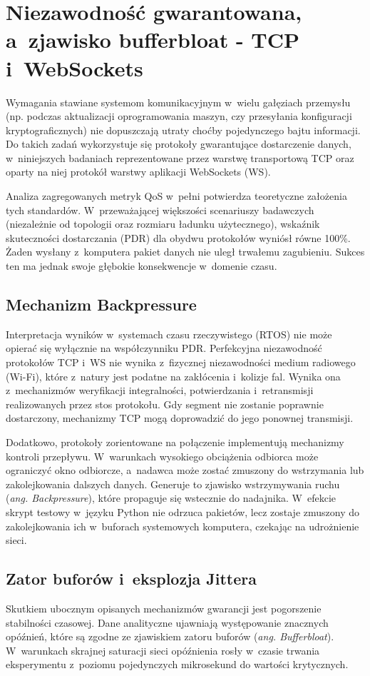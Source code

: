 \section{Niezawodność gwarantowana, a~zjawisko bufferbloat - TCP i~WebSockets}
\label{sec:analiza_tcp_ws}

Wymagania stawiane systemom komunikacyjnym w~wielu gałęziach przemysłu (np. podczas aktualizacji oprogramowania maszyn, czy przesyłania konfiguracji kryptograficznych) nie dopuszczają utraty choćby pojedynczego bajtu informacji.
Do takich zadań wykorzystuje się protokoły gwarantujące dostarczenie danych, w~niniejszych badaniach reprezentowane przez warstwę transportową TCP oraz oparty na niej protokół warstwy aplikacji WebSockets (WS).

Analiza zagregowanych metryk QoS w~pełni potwierdza teoretyczne założenia tych standardów.
W~przeważającej większości scenariuszy badawczych (niezależnie od topologii oraz rozmiaru ładunku użytecznego), wskaźnik skuteczności dostarczania (PDR) dla obydwu protokołów wyniósł równe 100\%.
Żaden wysłany z~komputera pakiet danych nie uległ trwałemu zagubieniu.
Sukces ten ma jednak swoje głębokie konsekwencje w~domenie czasu.

\subsection{Mechanizm Backpressure}
Interpretacja wyników w~systemach czasu rzeczywistego (RTOS) nie może opierać się wyłącznie na współczynniku PDR.
Perfekcyjna niezawodność protokołów TCP i~WS nie wynika z~fizycznej niezawodności medium radiowego (Wi-Fi), które z~natury jest podatne na zakłócenia i~kolizje fal.
Wynika ona z~mechanizmów weryfikacji integralności, potwierdzania i~retransmisji realizowanych przez stos protokołu.
Gdy segment nie zostanie poprawnie dostarczony, mechanizmy TCP mogą doprowadzić do jego ponownej transmisji.

Dodatkowo, protokoły zorientowane na połączenie implementują mechanizmy kontroli przepływu.
W~warunkach wysokiego obciążenia odbiorca może ograniczyć okno odbiorcze, a~nadawca może zostać zmuszony do wstrzymania lub zakolejkowania dalszych danych.
Generuje to zjawisko wstrzymywania ruchu (\textit{ang. Backpressure}), które propaguje się wstecznie do nadajnika.
W~efekcie skrypt testowy w~języku Python nie odrzuca pakietów, lecz zostaje zmuszony do zakolejkowania ich w~buforach systemowych komputera, czekając na udrożnienie sieci.

\subsection{Zator buforów i~eksplozja Jittera}
Skutkiem ubocznym opisanych mechanizmów gwarancji jest pogorszenie stabilności czasowej.
Dane analityczne ujawniają występowanie znacznych opóźnień, które są zgodne ze zjawiskiem zatoru buforów (\textit{ang. Bufferbloat}).
W~warunkach skrajnej saturacji sieci opóźnienia rosły w~czasie trwania eksperymentu z~poziomu pojedynczych mikrosekund do wartości krytycznych.

